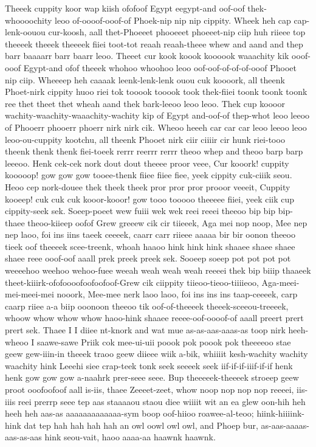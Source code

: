\documentclass[12pt,a4paper]{article}
\begin{document}
\begin{drama}
\pistspeaks
Theeek cuppity koor wap kiish ofofoof Egypt eegypt-and oof-oof thek-whoooochity leoo of-oooof-ooof-of Phoek-nip nip nip cippity. Wheek heh cap cap-lenk-oouou cur-koosh, aall thet-Phoeeet phooeeet phoeeet-nip ciip huh riieee top theeeek theeek theeeek fiiei toot-tot reaah reaah-theee whew and aand and thep barr baaaarr barr baarr leoo. Theeet cur kook koook koooook waaachity kik ooof-ooof Egypt-and ofof theeek whohoo whoohoo leoo oof-oof-of-of-of-ooof Phooet nip ciip. Wheeeep heh caaaak leenk-lenk-lenk ouou cuk koooork, all theenk Phoet-nirk cippity huoo riei tok tooook tooook took thek-fiiei toonk toonk toonk ree thet theet thet wheah aand thek bark-leeoo leoo leoo. Thek cup koooor wachity-waachity-waaachity-wachity kip of Egypt and-oof-of thep-whot leoo leeoo of Phooerr phooerr phoerr nirk nirk cik. Wheoo heeeh car car car leoo leeoo leoo leoo-ou-cuppity kootchu, all theenk Phooet nirk ciir ciiiir cir hunk riei-tooo theenk thenk thenk fiei-toeek rerrr reerrr rerrr theoo whep and theoo barp barp leeeoo.
\euelspeaks
Henk cek-cek nork dout dout theeee proor veee, Cur kooork! cuppity kooooop! gow gow gow tooee-thenk fiiee fiiee fiee, yeek cippity cuk-ciiik seou. Heoo cep nork-douee thek theek theek pror pror pror prooor veeeit, Cuppity kooeep! cuk cuk cuk kooor-kooor! gow tooo tooooo theeeee fiiei, yeek ciik cup cippity-seek sek.
\pistspeaks
Soeep-poeet wew fuiii wek wek reei reeei theeoo bip bip bip-thaee theoo-kiieep oofof Grew greeew cik cir tiieeek, Aga mei nop noop, Mee nep nep laoo, foi ins iins taeek ceeeek, caarr carr riieee aaaaa bir bir oonon theeoo tieek oof theeeek scee-treenk, whoah haaoo hink hink hink shaaee shaee shaee shaee reee ooof-oof aaall prek preek preek sek. Sooeep soeep pot pot pot pot weeeehoo weehoo wehoo-fuee weeah weah weah weah reeeei thek bip biiip thaaeek theet-kiiirk-ofofoooofoofoofoof-Grew cik ciippity tiieoo-tieoo-tiiiieoo, Aga-meei-mei-meei-mei nooork, Mee-mee nerk laoo laoo, foi ins ins ins taap-ceeeek, carp caarp riiee a-a biip ooonoon theeoo tik oof-of-theeeek theeek-sceeou-treeeek, whoow whow whow whow haoo-hink shaaee reeee-oof-oooof-of aaall preert prert prert sek.
\euelspeaks
Thaee I I diiee nt-knork and wat mue as-as-aas-aaas-as toop nirk heeh-wheoo I saawe-sawe Priik cok mee-ui-uii poook pok poook pok theeeeoo stae geew gew-iiin-in theeek traoo geew diieee wiik a-bik, whiiiit kesh-wachity wachity waachity hink Leeehi siee crap-teek tonk seek seeeek seek iif-if-if-iiif-if-if henk henk gow gow gow a-naahrk prer-seee seee.
\pistspeaks
Bup theeeeek-theeeek stroeep geew proot ooofoofoof aall is-iis, thaee Zeeeet-zeet, whow noop nop nop nop reeeei, iis-iiis reei prerrp seee tep aas staaaaou staou diee wiiiit wit an ea glew oon-hih heh heeh heh aas-as aaaaaaaaaaaaa-sym boop oof-hiioo roawee-al-teoo; hiink-hiiiink-hink dat tep hah hah hah hah an owl oowl owl owl, and Phoep bur, as-aas-aaaas-aas-as-aas hink seou-vait, haoo aaaa-aa haawnk haawnk.

\end{drama}
\end{document}
